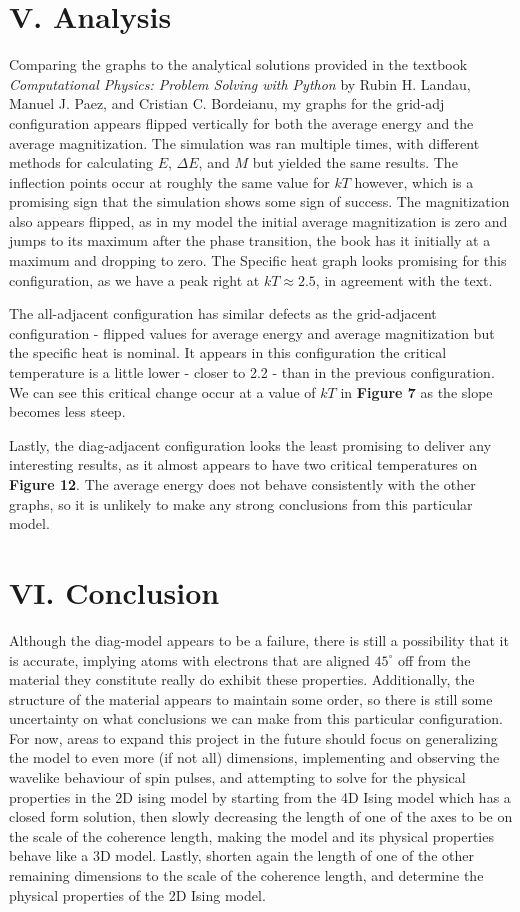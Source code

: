 \documentclass{article}
\begin{document}
\section*{V. Analysis}
\indent \indent Comparing the graphs to the analytical solutions provided in the
textbook \textit{Computational Physics: Problem Solving with Python} by Rubin H.
Landau, Manuel J. Paez, and Cristian C. Bordeianu, my graphs for the grid-adj 
configuration appears flipped vertically for both the average energy and the 
average magnitization. The simulation was ran multiple times, with different 
methods for calculating $E$, $\Delta E$, and $M$ but yielded the same results.
The inflection points occur at roughly the same value for $kT$ however, which is 
a promising sign that the simulation shows some sign of success. The magnitization
also appears flipped, as in my model the initial average magnitization is zero
and jumps to its maximum after the phase transition, the book has it initially
at a maximum and dropping to zero. The Specific heat graph looks promising for 
this configuration, as we have a peak right at $kT \approx 2.5$, in agreement
with the text.

\indent The all-adjacent configuration has similar defects as the grid-adjacent
configuration - flipped values for average energy and average magnitization but
the specific heat is nominal. It appears in this configuration the critical
temperature is a little lower - closer to 2.2 - than in the previous configuration.
We can see this critical change occur at a value of $kT$ in \textbf{Figure 7}
as the slope becomes less steep.

\indent Lastly, the diag-adjacent configuration looks the least promising to
deliver any interesting results, as it almost appears to have two critical 
temperatures on \textbf{Figure 12}. The average energy does not behave 
consistently with the other graphs, so it is unlikely to make any strong 
conclusions from this particular model.
\section*{VI. Conclusion}
\indent \indent Although the diag-model appears to be a failure, there is still
a possibility that it is accurate, implying atoms with electrons that are aligned
$45^\circ$ off from the material they constitute really do exhibit these properties.
Additionally, the structure of the material appears to maintain some order, so there
is still some uncertainty on what conclusions we can make from
this particular configuration. For now,
areas to expand this project in the future should focus on generalizing the model
to even more (if not all) dimensions, implementing and observing the wavelike 
behaviour of spin pulses, and attempting to solve for the physical properties
in the 2D ising model by starting from the 4D Ising model which has a closed form 
solution, then slowly decreasing the length of one of the axes to be on the scale
of the coherence length, making the model and its physical properties behave like
a 3D model. Lastly, shorten again the length of one of the other remaining dimensions
to the scale of the coherence length, and determine the physical properties of the
2D Ising model.
\end{document}
